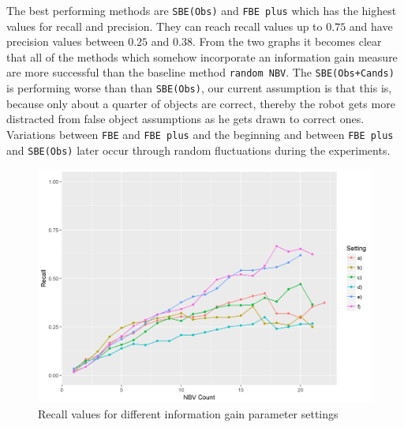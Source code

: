 \documentclass[a4paper,11pt,english]{article}
\begin{document}
The best performing methods are \texttt{SBE(Obs)} and \texttt{FBE plus} which has the highest values for recall and precision.
They can reach recall values up to $0.75$ and have precision values between $0.25$ and $0.38$.
From the two graphs it becomes clear that all of the methods which somehow incorporate an information gain measure are more successful than the baseline method \texttt{random NBV}.
The \texttt{SBE(Obs+Cands)} is performing worse than than \texttt{SBE(Obs)}, our current assumption is that this is, because only about a quarter of objects are correct, thereby the robot gets more distracted from false object assumptions as he gets drawn to correct ones.
Variations between \texttt{FBE} and \texttt{FBE plus} and the beginning and between \texttt{FBE plus} and \texttt{SBE(Obs)} later occur through random fluctuations during the experiments.

\begin{figure}[h]
	\begin{center}
		\includegraphics[width=\textwidth]{src/Plots/setting__recall_vs_nbv_count.png}
		\caption{Recall values for different information gain parameter settings}
		\label{fig:recall_vs_nbv_count_settings}
	\end{center}
\end{figure}
\end{document}
